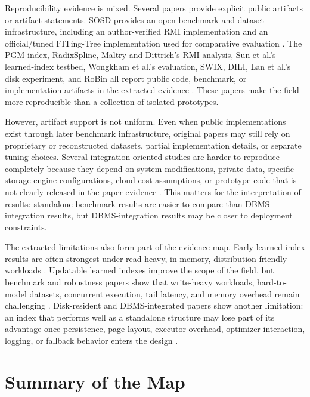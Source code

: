\documentclass[a4paper, 12pt, twoside]{report}
\begin{document}
Reproducibility evidence is mixed. Several papers provide explicit public artifacts or artifact statements. SOSD provides an open benchmark and dataset infrastructure, including an author-verified RMI implementation and an official/tuned FITing-Tree implementation used for comparative evaluation \cite{marcus2020benchmarking,kraska2018,galakatos2019fiting}. The PGM-index, RadixSpline, Maltry and Dittrich's RMI analysis, Sun et al.'s learned-index testbed, Wongkham et al.'s evaluation, SWIX, DILI, Lan et al.'s disk experiment, and RoBin all report public code, benchmark, or implementation artifacts in the extracted evidence \cite{ferragina2020pgm,kipf2020radixspline,maltry2022critical,sun2023learned,wongkham2022ready,liang2024swix,li2023dili,lan2023disk,luo2025robustness}. These papers make the field more reproducible than a collection of isolated prototypes.

However, artifact support is not uniform. Even when public implementations exist through later benchmark infrastructure, original papers may still rely on proprietary or reconstructed datasets, partial implementation details, or separate tuning choices. Several integration-oriented studies are harder to reproduce completely because they depend on system modifications, private data, specific storage-engine configurations, cloud-cost assumptions, or prototype code that is not clearly released in the paper evidence \cite{chatterjee2024limousine,fuad2026postlearn}. This matters for the interpretation of results: standalone benchmark results are easier to compare than DBMS-integration results, but DBMS-integration results may be closer to deployment constraints.

The extracted limitations also form part of the evidence map. Early learned-index results are often strongest under read-heavy, in-memory, distribution-friendly workloads \cite{marcus2020benchmarking}. Updatable learned indexes improve the scope of the field, but benchmark and robustness papers show that write-heavy workloads, hard-to-model datasets, concurrent execution, tail latency, and memory overhead remain challenging \cite{wongkham2022ready,sun2023learned,luo2025robustness}. Disk-resident and DBMS-integrated papers show another limitation: an index that performs well as a standalone structure may lose part of its advantage once persistence, page layout, executor overhead, optimizer interaction, logging, or fallback behavior enters the design \cite{lan2023disk,maharjan2023learnedstore,fuad2026postlearn}.

\section{Summary of the Map}
\end{document}
